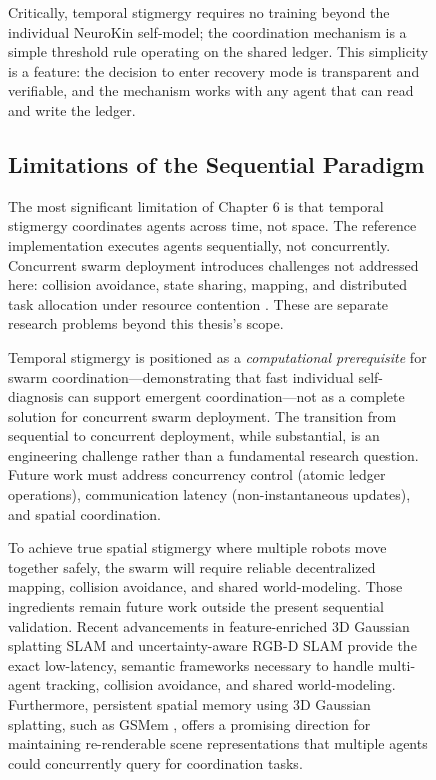 \documentclass[12pt,a4paper,oneside]{report}
\begin{document}
\begin{figure}[H]
Critically, temporal stigmergy requires no training beyond the individual NeuroKin self-model; the coordination mechanism is a simple threshold rule operating on the shared ledger. This simplicity is a feature: the decision to enter recovery mode is transparent and verifiable, and the mechanism works with any agent that can read and write the ledger.

\subsection{Limitations of the Sequential Paradigm}

The most significant limitation of Chapter 6 is that temporal stigmergy coordinates agents across time, not space. The reference implementation executes agents sequentially, not concurrently. Concurrent swarm deployment introduces challenges not addressed here: collision avoidance, state sharing, mapping, and distributed task allocation under resource contention \cite{matsuki2024gaussian, keetha2024splattam}. These are separate research problems beyond this thesis's scope.

Temporal stigmergy is positioned as a \textit{computational prerequisite} for swarm coordination---demonstrating that fast individual self-diagnosis can support emergent coordination---not as a complete solution for concurrent swarm deployment. The transition from sequential to concurrent deployment, while substantial, is an engineering challenge rather than a fundamental research question. Future work must address concurrency control (atomic ledger operations), communication latency (non-instantaneous updates), and spatial coordination. 

To achieve true spatial stigmergy where multiple robots move together safely, the swarm will require reliable decentralized mapping, collision avoidance, and shared world-modeling. Those ingredients remain future work outside the present sequential validation. Recent advancements in feature-enriched 3D Gaussian splatting SLAM \cite{thirgood2025featureslam} and uncertainty-aware RGB-D SLAM \cite{tran2025varsplat} provide the exact low-latency, semantic frameworks necessary to handle multi-agent tracking, collision avoidance, and shared world-modeling. Furthermore, persistent spatial memory using 3D Gaussian splatting, such as GSMem \cite{lu2025gsmem}, offers a promising direction for maintaining re-renderable scene representations that multiple agents could concurrently query for coordination tasks.


\end{figure}
\end{document}
